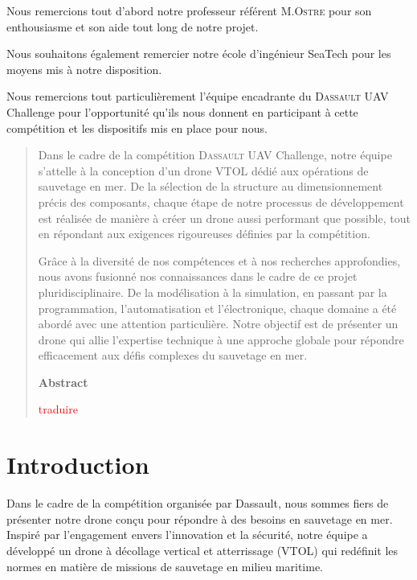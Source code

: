 \documentclass[a4paper,12pt,french]{report}
\begin{document}
Nous remercions tout d'abord notre professeur référent M.\textsc{Ostre} pour son enthousiasme et son aide tout long de notre projet.\newline

Nous souhaitons également remercier notre école d'ingénieur SeaTech pour les moyens mis à notre disposition.\newline

Nous remercions tout particulièrement l'équipe encadrante du \textsc{Dassault} UAV Challenge pour l'opportunité qu'ils nous donnent en participant à cette compétition et les dispositifs mis en place pour nous.

\tableofcontents


\begin{abstract}
    Dans le cadre de la compétition \textsc{Dassault} UAV Challenge, notre équipe s'attelle à la conception d'un drone VTOL dédié aux opérations de sauvetage en mer. De la sélection de la structure au dimensionnement précis des composants, chaque étape de notre processus de développement est réalisée de manière à créer un drone aussi performant que possible, tout en répondant aux exigences rigoureuses définies par la compétition.

    Grâce à la diversité de nos compétences et à nos recherches approfondies, nous avons fusionné nos connaissances dans le cadre de ce projet pluridisciplinaire. De la modélisation à la simulation, en passant par la programmation, l'automatisation et l'électronique, chaque domaine a été abordé avec une attention particulière. Notre objectif est de présenter un drone qui allie l'expertise technique à une approche globale pour répondre efficacement aux défis complexes du sauvetage en mer. \vskip4cm

    \begin{center}
        \bfseries Abstract
    \end{center}

    \noindent
    \textcolor{red}{traduire}
\end{abstract}

\chapter*{Introduction}

Dans le cadre de la compétition organisée par Dassault, nous sommes fiers de présenter notre drone conçu pour répondre à des besoins en sauvetage en mer. Inspiré par l'engagement envers l'innovation et la sécurité, notre équipe a développé un drone à décollage vertical et atterrissage (VTOL) qui redéfinit les normes en matière de missions de sauvetage en milieu maritime.\newline
\end{document}

